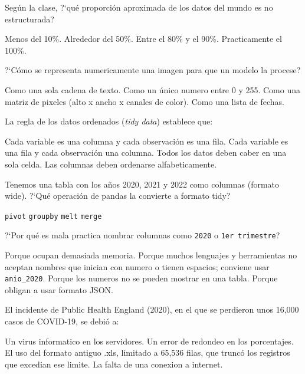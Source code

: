 \documentclass[12pt,addpoints]{exam}
\begin{document}
\begin{questions}
\question[1] Seg\'un la clase, ?`qu\'e proporci\'on aproximada de los datos del
mundo es no estructurada?
\begin{choices}
  \choice Menos del 10\%.
  \choice Alrededor del 50\%.
  \CorrectChoice Entre el 80\% y el 90\%.
  \choice Practicamente el 100\%.
\end{choices}

\question[1] ?`C\'omo se representa numericamente una imagen para que un modelo
la procese?
\begin{choices}
  \choice Como una sola cadena de texto.
  \choice Como un \'unico numero entre 0 y 255.
  \CorrectChoice Como una matriz de pixeles (alto x ancho x canales de color).
  \choice Como una lista de fechas.
\end{choices}

\question[1] La regla de los datos ordenados (\emph{tidy data}) establece que:
\begin{choices}
  \CorrectChoice Cada variable es una columna y cada observaci\'on es una fila.
  \choice Cada variable es una fila y cada observaci\'on una columna.
  \choice Todos los datos deben caber en una sola celda.
  \choice Las columnas deben ordenarse alfabeticamente.
\end{choices}

\question[1] Tenemos una tabla con los a\~nos 2020, 2021 y 2022 como columnas
(formato wide). ?`Qu\'e operaci\'on de pandas la convierte a formato tidy?
\begin{choices}
  \choice \texttt{pivot}
  \choice \texttt{groupby}
  \CorrectChoice \texttt{melt}
  \choice \texttt{merge}
\end{choices}

\question[1] ?`Por qu\'e es mala practica nombrar columnas como \texttt{2020} o
\texttt{1er trimestre}?
\begin{choices}
  \choice Porque ocupan demasiada memoria.
  \CorrectChoice Porque muchos lenguajes y herramientas no aceptan nombres que
    inician con numero o tienen espacios; conviene usar \texttt{anio\_2020}.
  \choice Porque los numeros no se pueden mostrar en una tabla.
  \choice Porque obligan a usar formato JSON.
\end{choices}

\question[1] El incidente de Public Health England (2020), en el que se perdieron
unos 16,000 casos de COVID-19, se debi\'o a:
\begin{choices}
  \choice Un virus informatico en los servidores.
  \choice Un error de redondeo en los porcentajes.
  \CorrectChoice El uso del formato antiguo .xls, limitado a 65,536 filas, que
    trunc\'o los registros que excedian ese limite.
  \choice La falta de una conexion a internet.
\end{choices}


\end{questions}
\end{document}
